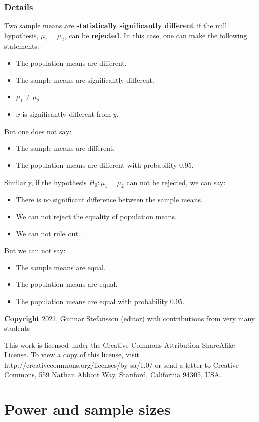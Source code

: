 \documentclass[12pt,a4paper]{article}
\theoremstyle{regla}
\theoremstyle{remark}
\theoremstyle{definition}
\theoremstyle{nonumberbreak}
\begin{document}
\subsubsection{Details}
Two sample means are \textbf{statistically significantly different} if the null hypothesis, $\mu_1 = \mu_2$, can be \textbf{rejected}.
In this case, one can make the following statements:
\begin{itemize}
\item
The population means are different.
\item
The sample means are significantly different.
\item
$\mu_1 \ne \mu_2$
\item
$\bar{x}$ is significantly different from $\bar{y}$.
\end{itemize}
But one does not say:
\begin{itemize}
\item
The sample means are different.
\item
The population means are different with probability 0.95.
\end{itemize}
Similarly, if the hypothesis $H_0: \mu_1 = \mu_2$ can not be rejected, we can say:
\begin{itemize}
\item
There is no significant difference between the sample means.
\item
We can not reject the equality of population means.
\item
We can not rule out...
\end{itemize}
But we can not say:
\begin{itemize}
\item
The sample means are equal.
\item
The population means are equal.
\item
The population means are equal with probability 0.95.
\end{itemize}

{\bf Copyright}
2021, Gunnar Stefansson (editor) with contributions from very many students

This work is licensed under the Creative Commons
Attribution-ShareAlike License. To view a copy of this license, visit
http://creativecommons.org/licenses/by-sa/1.0/ or send a letter to
Creative Commons, 559 Nathan Abbott Way, Stanford, California 94305,
USA.
\clearpage
\section{Power and sample sizes}
\end{document}

